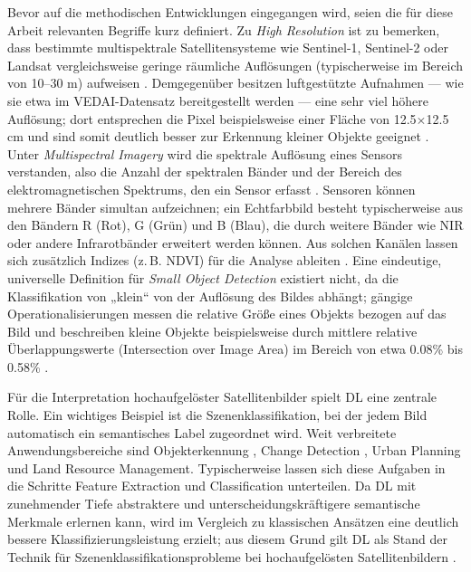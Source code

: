 Bevor auf die methodischen Entwicklungen eingegangen wird, seien die für diese Arbeit relevanten Begriffe kurz definiert. Zu \emph{High Resolution} ist zu bemerken, dass bestimmte multispektrale Satellitensysteme wie Sentinel-1, Sentinel-2 oder Landsat vergleichsweise geringe räumliche Auflösungen (typischerweise im Bereich von 10–30 m) aufweisen \cite{Wieland2023}. Demgegenüber besitzen luftgestützte Aufnahmen — wie sie etwa im \acrlong{VEDAI}-Datensatz bereitgestellt werden — eine sehr viel höhere Auflösung; dort entsprechen die Pixel beispielsweise einer Fläche von 12.5\(\times\)12.5 cm und sind somit deutlich besser zur Erkennung kleiner Objekte geeignet \cite{Razakarivony2015}. Unter \emph{Multispectral Imagery} wird die spektrale Auflösung eines Sensors verstanden, also die Anzahl der spektralen Bänder und der Bereich des elektromagnetischen Spektrums, den ein Sensor erfasst \cite{Khan2018}. Sensoren können mehrere Bänder simultan aufzeichnen; ein Echtfarbbild besteht typischerweise aus den Bändern R (Rot), G (Grün) und B (Blau), die durch weitere Bänder wie \acrfull{NIR} oder andere Infrarotbänder erweitert werden können. Aus solchen Kanälen lassen sich zusätzlich Indizes (z.\,B. \acrfull{NDVI}) für die Analyse ableiten \cite{Wiley2018}. Eine eindeutige, universelle Definition für \emph{Small Object Detection} existiert nicht, da die Klassifikation von „klein“ von der Auflösung des Bildes abhängt; gängige Operationalisierungen messen die relative Größe eines Objekts bezogen auf das Bild und beschreiben kleine Objekte beispielsweise durch mittlere relative Überlappungswerte (Intersection over Image Area) im Bereich von etwa 0.08\% bis 0.58\% \cite{Chen2017}.

Für die Interpretation hochaufgelöster Satellitenbilder spielt \Acrlong{DL} eine zentrale Rolle. Ein wichtiges Beispiel ist die Szenenklassifikation, bei der jedem Bild automatisch ein semantisches Label zugeordnet wird. Weit verbreitete Anwendungsbereiche sind Objekterkennung \cite{Bhagavathy2006,Cheng2016}, Change Detection \cite{Chen2006}, Urban Planning und Land Resource Management. Typischerweise lassen sich diese Aufgaben in die Schritte Feature Extraction und Classification unterteilen. Da \Acrlong{DL} mit zunehmender Tiefe abstraktere und unterscheidungskräftigere semantische Merkmale erlernen kann, wird im Vergleich zu klassischen Ansätzen eine deutlich bessere Klassifizierungsleistung erzielt; aus diesem Grund gilt \Acrlong{DL} als Stand der Technik für Szenenklassifikationsprobleme bei hochaufgelösten Satellitenbildern \cite{Zhu2017}.

